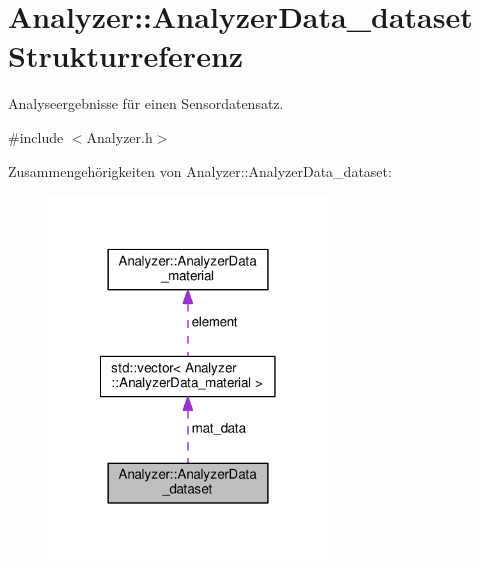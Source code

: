 \hypertarget{structAnalyzer_1_1AnalyzerData__dataset}{\section{Analyzer\-:\-:Analyzer\-Data\-\_\-dataset Strukturreferenz}
\label{structAnalyzer_1_1AnalyzerData__dataset}
}


Analyseergebnisse für einen Sensordatensatz.  




{\ttfamily \#include $<$Analyzer.\-h$>$}



Zusammengehörigkeiten von Analyzer\-:\-:Analyzer\-Data\-\_\-dataset\-:\nopagebreak
\begin{figure}[H]
\begin{center}
\leavevmode
\includegraphics[width=210pt]{structAnalyzer_1_1AnalyzerData__dataset__coll__graph}
\end{center}
\end{figure}
